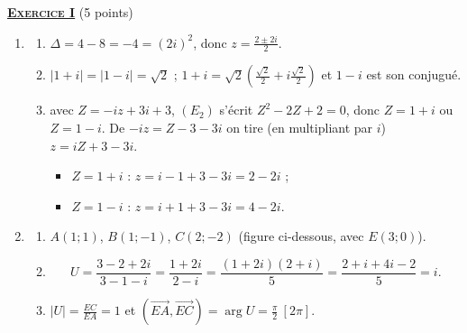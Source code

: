 \providecommand{\Courbe}{(\mathscr{C})}
\providecommand{\CourbeP}{(\mathscr{C}')}
\providecommand{\cm}{~\mathrm{cm}}
\providecommand{\dx}{~\mathrm{d}x}
%
\noindent \underline{\textsc{\textbf{Exercice I}}} (5 points)
	\begin{enumerate}
		\item \begin{enumerate}
			\item {}
				$\Delta = 4 - 8 = -4 = (2i)^2$, donc $z = \frac{2 \pm 2i}{2}$.

			\item {}
				$|1 + i| = |1 - i| = \sqrt{2}$ ; $1 + i = \sqrt{2}\left(\frac{\sqrt{2}}{2} + i\frac{\sqrt{2}}{2}\right)$ et $1 - i$ est son conjugué.

			\item {}
				avec $Z = -iz + 3i + 3$, $(E_2)$ s'écrit $Z^2 - 2Z + 2 = 0$, donc $Z = 1 + i$ ou $Z = 1 - i$.
				De $-iz = Z - 3 - 3i$ on tire (en multipliant par $i$) $z = iZ + 3 - 3i$.
				\begin{itemize}
					\item $Z = 1 + i$ : $z = i - 1 + 3 - 3i = 2 - 2i$ ;
					\item $Z = 1 - i$ : $z = i + 1 + 3 - 3i = 4 - 2i$.
				\end{itemize}

		\end{enumerate}
		\item \begin{enumerate}
			\item {} $A(1;1)$, $B(1;-1)$, $C(2;-2)$ (figure ci-dessous, avec $E(3;0)$).
			\item {}
				\[
					U = \frac{3 - 2 + 2i}{3 - 1 - i} = \frac{1 + 2i}{2 - i} = \frac{(1+2i)(2+i)}{5} = \frac{2 + i + 4i - 2}{5} = i.
				\]

			\item {}
				$|U| = \frac{EC}{EA} = 1$ et $\left(\overrightarrow{EA},\overrightarrow{EC}\right) = \arg U = \frac{\pi}{2}~[2\pi]$.


\end{enumerate}
\end{enumerate}
